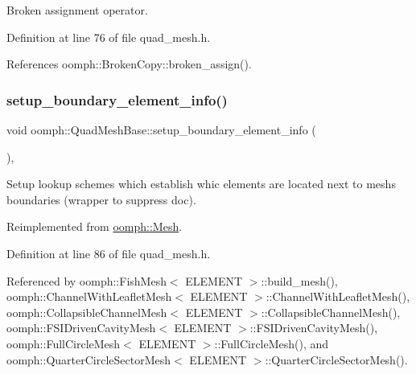 Broken assignment operator. 



Definition at line 76 of file quad\+\_\+mesh.\+h.



References oomph\+::\+Broken\+Copy\+::broken\+\_\+assign().

\mbox{\label{classoomph_1_1QuadMeshBase_ad1e5291285fbf34c62cbd45156dded2d}} 
\subsubsection{\texorpdfstring{setup\+\_\+boundary\+\_\+element\+\_\+info()}{setup\_boundary\_element\_info()}\hspace{0.1cm}{\footnotesize\ttfamily [1/2]}}
{\footnotesize\ttfamily void oomph\+::\+Quad\+Mesh\+Base\+::setup\+\_\+boundary\+\_\+element\+\_\+info (\begin{DoxyParamCaption}{ }\end{DoxyParamCaption})\hspace{0.3cm}{\ttfamily [inline]}, {\ttfamily [virtual]}}

Setup lookup schemes which establish whic elements are located next to mesh\textquotesingle{}s boundaries (wrapper to suppress doc). 

Reimplemented from \hyperlink{classoomph_1_1Mesh_a6cc8bcd6b41209f0e9295cc993d9c6bb}{oomph\+::\+Mesh}.



Definition at line 86 of file quad\+\_\+mesh.\+h.



Referenced by oomph\+::\+Fish\+Mesh$<$ E\+L\+E\+M\+E\+N\+T $>$\+::build\+\_\+mesh(), oomph\+::\+Channel\+With\+Leaflet\+Mesh$<$ E\+L\+E\+M\+E\+N\+T $>$\+::\+Channel\+With\+Leaflet\+Mesh(), oomph\+::\+Collapsible\+Channel\+Mesh$<$ E\+L\+E\+M\+E\+N\+T $>$\+::\+Collapsible\+Channel\+Mesh(), oomph\+::\+F\+S\+I\+Driven\+Cavity\+Mesh$<$ E\+L\+E\+M\+E\+N\+T $>$\+::\+F\+S\+I\+Driven\+Cavity\+Mesh(), oomph\+::\+Full\+Circle\+Mesh$<$ E\+L\+E\+M\+E\+N\+T $>$\+::\+Full\+Circle\+Mesh(), and oomph\+::\+Quarter\+Circle\+Sector\+Mesh$<$ E\+L\+E\+M\+E\+N\+T $>$\+::\+Quarter\+Circle\+Sector\+Mesh().

